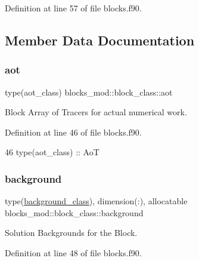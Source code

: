Definition at line 57 of file blocks.\+f90.



\subsection{Member Data Documentation}
\mbox{\label{structblocks__mod_1_1block__class_a53f912fe57eb5e386ca62b1dbd087417}} 
\subsubsection{\texorpdfstring{aot}{aot}}
{\footnotesize\ttfamily type(aot\+\_\+class) blocks\+\_\+mod\+::block\+\_\+class\+::aot\hspace{0.3cm}{\ttfamily [private]}}



Block Array of Tracers for actual numerical work. 



Definition at line 46 of file blocks.\+f90.


\begin{DoxyCode}
46         \textcolor{keywordtype}{type}(aot\_class)        :: AoT
\end{DoxyCode}
\mbox{\label{structblocks__mod_1_1block__class_a774c07bf82d1392236abc81c285ea943}} 
\subsubsection{\texorpdfstring{background}{background}}
{\footnotesize\ttfamily type(\mbox{\hyperlink{structbackground__mod_1_1background__class}{background\+\_\+class}}), dimension(\+:), allocatable blocks\+\_\+mod\+::block\+\_\+class\+::background\hspace{0.3cm}{\ttfamily [private]}}



Solution Backgrounds for the Block. 



Definition at line 48 of file blocks.\+f90.


